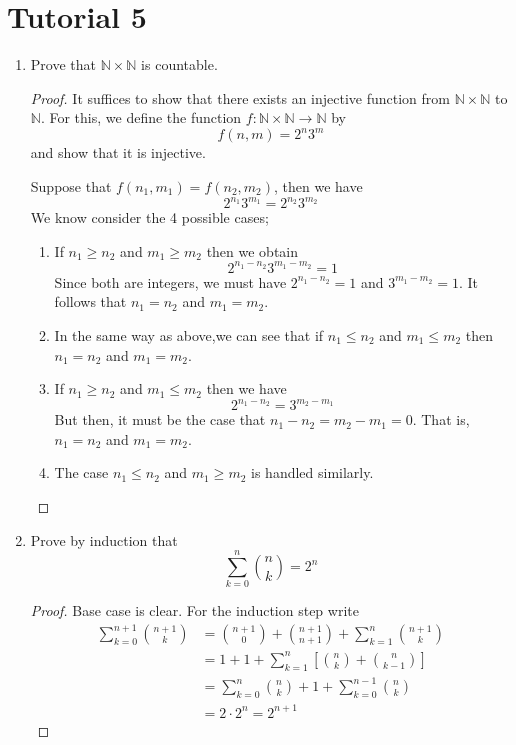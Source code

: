 \documentclass[12pt, reqno]{article}
\numberwithin{equation}{section}
\theoremstyle{definition}
\theoremstyle{remark}
\newcommand{\NN}{\mathbb{N}}
\begin{document}
\section*{Tutorial 5}

\begin{enumerate}[leftmargin=*]
	\item Prove that $\NN\times \NN$ is countable.

	      \begin{proof}
		      It suffices to show that there exists an injective function from $\NN\times \NN$ to $\NN$. For this, we define the function $f:\NN\times\NN\to\NN$ by
		      \[
			      f(n,m) = 2^n3^m
		      \]
		      and show that it is injective.

		      Suppose that $f(n_1, m_1) = f(n_2, m_2)$, then we have
		      \[
			      2^{n_1}3^{m_1} = 2^{n_2}3^{m_2}
		      \]
		      We know consider the 4 possible cases;
		      \begin{enumerate}
			      \item If $n_1 \geq n_2$ and $m_1 \geq m_2$ then we obtain
			            \[
				            2^{n_1-n_2}3^{m_1 - m_2} = 1
			            \]
			            Since both are integers, we must have $2^{n_1-n_2} = 1$ and $3^{m_1-m_2} = 1$. It follows that $n_1=n_2$ and $m_1=m_2$.
			      \item In the same way as above,we can see that if  $n_1 \leq n_2$ and $m_1 \leq m_2$ then $n_1=n_2$ and $m_1=m_2$.
			      \item If $n_1\geq n_2$ and $m_1 \leq m_2$ then we have
			            \[
				            2^{n_1 - n_2} = 3^{m_2-m_1}
			            \]
			            But then, it must be the case that $n_1 - n_2 = m_2-m_1 = 0$. That is, $n_1=n_2$ and $m_1=m_2$.
			      \item The case $n_1\leq n_2$ and $m_1 \geq m_2$ is handled similarly.
		      \end{enumerate}
	      \end{proof}

	\item Prove by induction that
	      \[
		      \sum_{k=0}^n \binom{n}{k} = 2^n
	      \]

	      \begin{proof}
		      Base case is clear. For the induction step write
		      \begin{align*}
			      \sum_{k=0}^{n+1} \binom{n+1}{k}
			       & =\binom{n+1}{0}+\binom{n+1}{n+1} + \sum_{k=1}^n\binom{n+1}{k} \\
			       & =1+1+\sum_{k=1}^n\left[\binom{n}{k} + \binom{n}{k-1}\right]   \\
			       & =\sum_{k=0}^n\binom{n}{k} + 1+\sum_{k=0}^{n-1} \binom{n}{k}   \\
			       & =2\cdot 2^n = 2^{n+1}
		      \end{align*}
	      \end{proof}


\end{enumerate}
\end{document}
